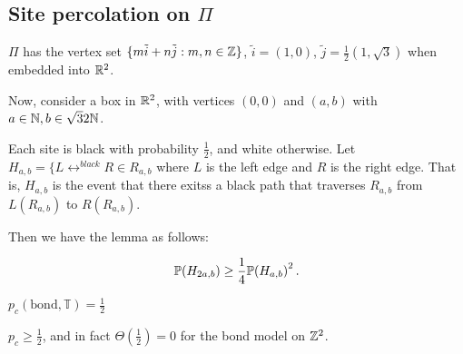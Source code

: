\subsection{Site percolation on $\Pi$}
\label{sec:site-percolation-pi}

$\Pi$ has the vertex set $\{ m \tilde i + n \tilde j: m, n \in \mathbb{Z}\}$,
$\tilde i = (1, 0)$, $\tilde j = \frac{1}{2}(1, \sqrt{3})$ when
embedded into $\mathbb{R}^{2}$.

Now, consider a box in $\mathbb{R}^{2}$, with vertices $(0, 0)$ and $(a, b)$
with $a \in \mathbb{N}, b \in \sqrt{3}{2} \mathbb{N}$.

Each site is black with probability $\frac{1}{2}$, and white
otherwise.  Let $H_{a, b} = \{ L \leftrightarrow^{black} R \in R_{a,
  b}$ where $L$ is the left edge and $R$ is the right edge.  That is,
$H_{a, b}$ is the event that there exitss a black path that traverses
$R_{a, b}$ from $L(R_{a, b})$ to $R(R_{a, b})$.

Then we have the lemma as follows:

\begin{lem}
  \begin{align}
    \label{eq:40}
    \Prob{H_{2a, b}} \geq \frac{1}{4} \Prob{H_{a, b}}^{2}.
  \end{align}
\end{lem}


\begin{thm}
  \label{defn:random_walks_on_graphs:25}
  $p_{c}(\text{bond}, \mathbb{T}) = \frac{1}{2}$
\end{thm}

\begin{thm}
  \label{defn:random_walks_on_graphs:27}
  $p_{c} \geq \frac{1}{2}$, and in fact $\Theta(\frac{1}{2}) = 0$ for
  the bond model on $\mathbb{Z}^{2}$.
\end{thm}

